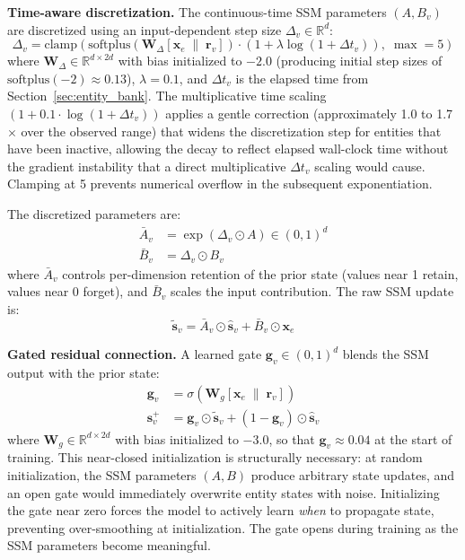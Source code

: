 \documentclass[letterpaper,twocolumn,10pt]{article}
\begin{document}
\textbf{Time-aware discretization.} The continuous-time SSM parameters $(A, B_v)$ are discretized using an input-dependent step size $\Delta_v \in \mathbb{R}^d$:
\begin{equation}
    \Delta_v = \text{clamp}\!\left(\text{softplus}\!\left(\mathbf{W}_\Delta [\mathbf{x}_e \;\|\; \mathbf{r}_v]\right) \cdot \left(1 + \lambda \log(1 + \Delta t_v)\right),\; \max\!=5\right)
    \label{eq:delta}
\end{equation}
where $\mathbf{W}_\Delta \in \mathbb{R}^{d \times 2d}$ with bias initialized to $-2.0$ (producing initial step sizes of $\text{softplus}(-2) \approx 0.13$), $\lambda = 0.1$, and $\Delta t_v$ is the elapsed time from Section~\ref{sec:entity_bank}. The multiplicative time scaling $(1 + 0.1 \cdot \log(1 + \Delta t_v))$ applies a gentle correction (approximately 1.0 to 1.7$\times$ over the observed range) that widens the discretization step for entities that have been inactive, allowing the decay to reflect elapsed wall-clock time without the gradient instability that a direct multiplicative $\Delta t_v$ scaling would cause. Clamping at 5 prevents numerical overflow in the subsequent exponentiation.

The discretized parameters are:
\begin{align}
    \bar{A}_v &= \exp(\Delta_v \odot A) \in (0, 1)^d \label{eq:A_bar} \\
    \bar{B}_v &= \Delta_v \odot B_v \label{eq:B_bar}
\end{align}
where $\bar{A}_v$ controls per-dimension retention of the prior state (values near 1 retain, values near 0 forget), and $\bar{B}_v$ scales the input contribution. The raw SSM update is:
\begin{equation}
    \tilde{\mathbf{s}}_v = \bar{A}_v \odot \hat{\mathbf{s}}_v + \bar{B}_v \odot \mathbf{x}_e
    \label{eq:ssm_raw}
\end{equation}

\textbf{Gated residual connection.} A learned gate $\mathbf{g}_v \in (0, 1)^d$ blends the SSM output with the prior state:
\begin{align}
    \mathbf{g}_v &= \sigma\!\left(\mathbf{W}_g [\mathbf{x}_e \;\|\; \mathbf{r}_v]\right) \label{eq:gate} \\
    \mathbf{s}_v^{+} &= \mathbf{g}_v \odot \tilde{\mathbf{s}}_v + (1 - \mathbf{g}_v) \odot \hat{\mathbf{s}}_v \label{eq:gated_update}
\end{align}
where $\mathbf{W}_g \in \mathbb{R}^{d \times 2d}$ with bias initialized to $-3.0$, so that $\mathbf{g}_v \approx 0.04$ at the start of training. This near-closed initialization is structurally necessary: at random initialization, the SSM parameters $(A, B)$ produce arbitrary state updates, and an open gate would immediately overwrite entity states with noise. Initializing the gate near zero forces the model to actively learn \emph{when} to propagate state, preventing over-smoothing at initialization. The gate opens during training as the SSM parameters become meaningful.
\end{document}

